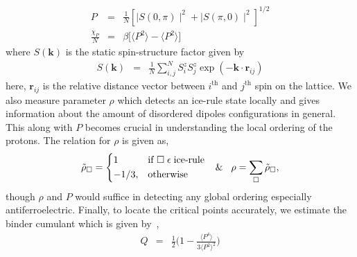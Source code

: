 \begin{eqnarray}
P &=&\frac{1}{N}[\mid S(0,\pi)\mid^2 + \mid S(\pi,0)\mid^2]^{1/2} \\
\frac{\chi_P}{N}&=&\beta\bigg[\langle P^2\rangle - \langle P^2\rangle\bigg]
\end{eqnarray}
where $S(\textbf{k})$ is the static spin-structure factor given by
\begin{eqnarray}
S(\textbf{k})&=&\frac{1}{N}\sum\limits_{i,j}^{N} S_{i}^z S_{j}^z\exp{(-\textbf{k}\cdot\textbf{r}_{ij})}
\end{eqnarray}
here, $\textbf{r}_{ij}$ is the relative distance vector between $i^{\text{th}}$ and $j^{\text{th}}$ spin on the lattice. We also measure parameter $\rho$ which detects an ice-rule state locally and gives information about the amount of disordered dipoles configurations in general. This along with $P$ becomes crucial in understanding the local ordering of the protons. The relation for $\rho$ is given as, %
\begin{align}
    \tilde{\rho}_\square=
\begin{dcases}
    1               & \text{if } \square \hspace{0.1cm}  \epsilon \hspace{0.1cm} \text{ice-rule}\\
    -1/3,              & \text{otherwise}
\end{dcases}
&& \& \hspace{0.3cm}
\rho = \sum_{\square}\tilde{\rho}_\square,
\end{align}
though $\rho$ and $P$ would suffice in detecting any global ordering especially antiferroelectric. Finally, to locate the critical points accurately, we estimate the binder cumulant which is given by~\cite{binder1981finite},
\begin{eqnarray}
Q &= & \frac{1}{2}\Bigg( 1-\frac{\langle P^4
\rangle}{3\langle P^2 \rangle^2}\Bigg)
\end{eqnarray}

